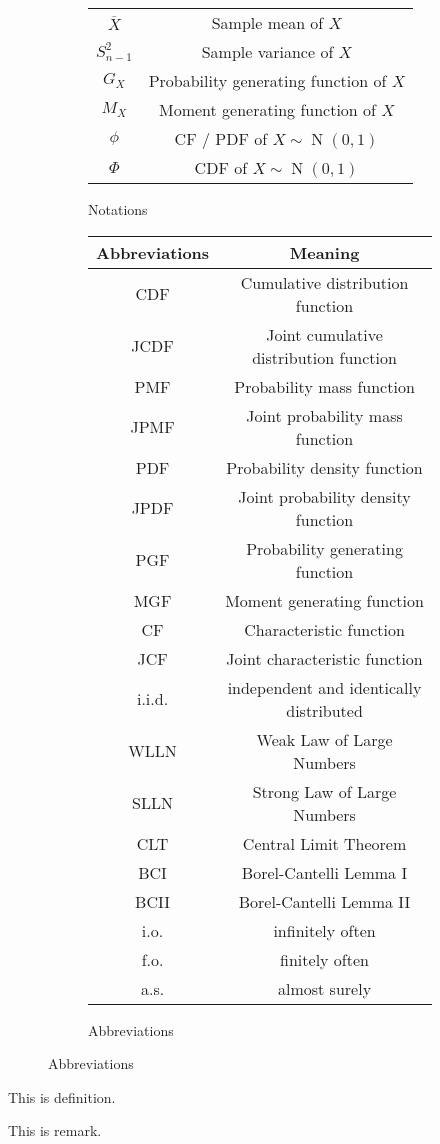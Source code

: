 \documentclass{huhtakm-template-book}
\DeclareMathOperator{\N}{N}
\begin{document}
\begin{figure}[h]
\begin{subfigure}{0.45\textwidth}
\begin{tabular}{cc}
			$\overline{X}$ & Sample mean of $X$\\
			$S_{n-1}^{2}$ & Sample variance of $X$\\
			$G_{X}$ & Probability generating function of $X$\\
			$M_{X}$ & Moment generating function of $X$\\
			$\phi$ & CF / PDF of $X\sim\N(0,1)$\\
			$\Phi$ & CDF of $X\sim\N(0,1)$
		\end{tabular}
		\caption{Notations}
	\end{subfigure}
	\begin{subfigure}{0.45\textwidth}
		\centering
		\begin{tabular}{cc}
			Abbreviations & Meaning\\
			\hline
			CDF & Cumulative distribution function\\
			JCDF & Joint cumulative distribution function\\
			PMF & Probability mass function\\
			JPMF & Joint probability mass function\\
			PDF & Probability density function\\
			JPDF & Joint probability density function\\
			PGF & Probability generating function\\
			MGF & Moment generating function\\
			CF & Characteristic function\\
			JCF & Joint characteristic function\\
			i.i.d. & independent and identically distributed\\
			WLLN & Weak Law of Large Numbers\\
			SLLN & Strong Law of Large Numbers\\
			CLT & Central Limit Theorem\\
			BCI & Borel-Cantelli Lemma I\\
			BCII & Borel-Cantelli Lemma II\\
			i.o. & infinitely often\\
			f.o. & finitely often\\
			a.s. & almost surely
		\end{tabular}
		\caption{Abbreviations}
	\end{subfigure}
\end{figure}
\begin{defn}
	This is definition.
\end{defn}
\begin{rem}
	This is remark.
\end{rem}
\end{document}
